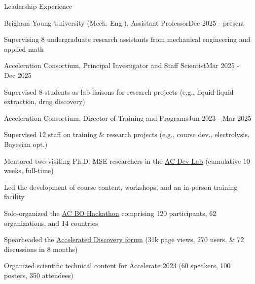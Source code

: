 \documentclass{resume} %
\begin{document}
{} %
\begin{rSection}{Leadership Experience}


\begin{rSubsection}{Brigham Young University (Mech. Eng.), Assistant Professor}{Dec 2025 - present}{} \\
\item Supervising 8 undergraduate research assistants from mechanical engineering and applied math
\end{rSubsection}
\begin{rSubsection}{Acceleration Consortium, Principal Investigator and Staff Scientist}{Mar 2025 - Dec 2025}{} \\
\item Supervised 8 students as lab liaisons for research projects (e.g., liquid-liquid extraction, drug discovery)
\end{rSubsection}
\begin{rSubsection}{Acceleration Consortium, Director of Training and Programs}{Jun 2023 - Mar 2025}{} \\
\item Supervised 12 staff on training \& research projects (e.g., course dev., electrolysis, Bayesian opt.)
\item Mentored two visiting Ph.D. MSE researchers in the \href{https://ac-training-lab.readthedocs.io/}{AC Dev Lab} (cumulative 10 weeks, full-time)
\item Led the development of course content, workshops, and an in-person training facility
\item Solo-organized the \href{https://ac-bo-hackathon.github.io/}{AC BO Hackathon} comprising 120 participants, 62 organizations, and 14 countries
\item Spearheaded the \href{https://accelerated-discovery.org}{Accelerated Discovery forum} (31k page views, 270 users, \& 72 discussions in 8 months)
\item Organized scientific technical content for Accelerate 2023 (60 speakers, 100 posters, 350 attendees)

\end{rSubsection}
\end{rSection}
\end{document}
